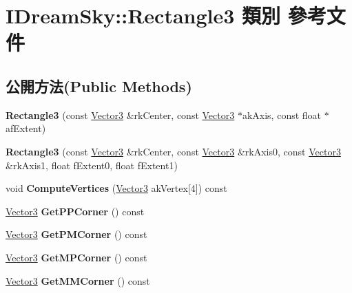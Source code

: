 \hypertarget{class_i_dream_sky_1_1_rectangle3}{}\section{I\+Dream\+Sky\+:\+:Rectangle3 類別 參考文件}
\label{class_i_dream_sky_1_1_rectangle3}
\subsection*{公開方法(Public Methods)}
\begin{DoxyCompactItemize}
\item 
{\bfseries Rectangle3} (const \hyperlink{class_i_dream_sky_1_1_vector3}{Vector3} \&rk\+Center, const \hyperlink{class_i_dream_sky_1_1_vector3}{Vector3} $\ast$ak\+Axis, const float $\ast$af\+Extent)\hypertarget{class_i_dream_sky_1_1_rectangle3_a87c32b97b58ff89c5706bf1ea29d464e}{}\label{class_i_dream_sky_1_1_rectangle3_a87c32b97b58ff89c5706bf1ea29d464e}

\item 
{\bfseries Rectangle3} (const \hyperlink{class_i_dream_sky_1_1_vector3}{Vector3} \&rk\+Center, const \hyperlink{class_i_dream_sky_1_1_vector3}{Vector3} \&rk\+Axis0, const \hyperlink{class_i_dream_sky_1_1_vector3}{Vector3} \&rk\+Axis1, float f\+Extent0, float f\+Extent1)\hypertarget{class_i_dream_sky_1_1_rectangle3_a620ccba9c0e3d316bffb6842683467a0}{}\label{class_i_dream_sky_1_1_rectangle3_a620ccba9c0e3d316bffb6842683467a0}

\item 
void {\bfseries Compute\+Vertices} (\hyperlink{class_i_dream_sky_1_1_vector3}{Vector3} ak\+Vertex\mbox{[}4\mbox{]}) const \hypertarget{class_i_dream_sky_1_1_rectangle3_ab7c5b3b587477be0d035285e2dbc4256}{}\label{class_i_dream_sky_1_1_rectangle3_ab7c5b3b587477be0d035285e2dbc4256}

\item 
\hyperlink{class_i_dream_sky_1_1_vector3}{Vector3} {\bfseries Get\+P\+P\+Corner} () const \hypertarget{class_i_dream_sky_1_1_rectangle3_a4a2a4a979755195a36d1fb5943164bbe}{}\label{class_i_dream_sky_1_1_rectangle3_a4a2a4a979755195a36d1fb5943164bbe}

\item 
\hyperlink{class_i_dream_sky_1_1_vector3}{Vector3} {\bfseries Get\+P\+M\+Corner} () const \hypertarget{class_i_dream_sky_1_1_rectangle3_a9e7bc22198c93a7067743ef40d61a1bc}{}\label{class_i_dream_sky_1_1_rectangle3_a9e7bc22198c93a7067743ef40d61a1bc}

\item 
\hyperlink{class_i_dream_sky_1_1_vector3}{Vector3} {\bfseries Get\+M\+P\+Corner} () const \hypertarget{class_i_dream_sky_1_1_rectangle3_a6e4838e49a4c819b5533a6162a9fb1e1}{}\label{class_i_dream_sky_1_1_rectangle3_a6e4838e49a4c819b5533a6162a9fb1e1}

\item 
\hyperlink{class_i_dream_sky_1_1_vector3}{Vector3} {\bfseries Get\+M\+M\+Corner} () const \hypertarget{class_i_dream_sky_1_1_rectangle3_aa1040fbaae298823417ba16532783e3a}{}\label{class_i_dream_sky_1_1_rectangle3_aa1040fbaae298823417ba16532783e3a}

\end{DoxyCompactItemize}
